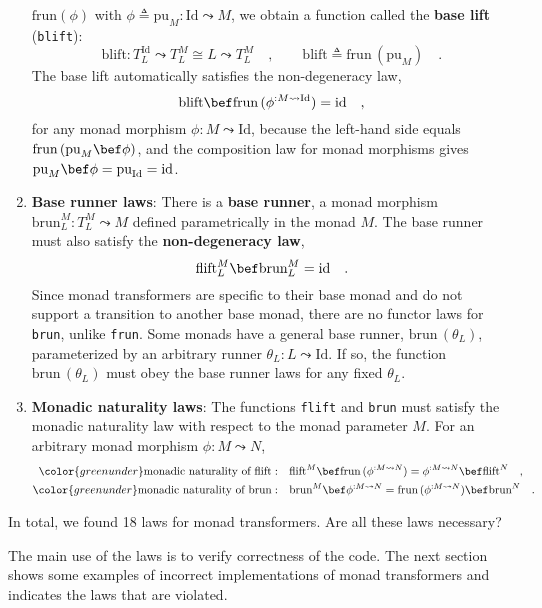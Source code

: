 \begin{enumerate}
$\text{frun}\left(\phi\right)$ with $\phi\triangleq\text{pu}_{M}:\text{Id}\leadsto M$,
we obtain a function called the \textbf{base
lift} (\lstinline!blift!):
\[
\text{blift}:T_{L}^{\text{Id}}\leadsto T_{L}^{M}\cong L\leadsto T_{L}^{M}\quad,\quad\quad\text{blift}\triangleq\text{frun}\,(\text{pu}_{M})\quad.
\]
The base lift automatically satisfies the non-degeneracy law,
\[
\text{blift}\bef\text{frun}\,(\phi^{:M\leadsto\text{Id}})=\text{id}\quad,
\]
for any monad morphism $\phi:M\leadsto\text{Id}$, because the left-hand
side equals $\text{frun}\,(\text{pu}_{M}\bef\phi)$, and the composition
law for monad morphisms gives $\text{pu}_{M}\bef\phi=\text{pu}_{\text{Id}}=\text{id}$.
\item \textbf{Base runner laws}:
There is a \textbf{base runner}, a monad morphism $\text{brun}_{L}^{M}:T_{L}^{M}\leadsto M$
defined parametrically in the monad $M$. The base runner must also
satisfy the \textbf{non-degeneracy law},
\[
\text{flift}_{L}^{M}\bef\text{brun}_{L}^{M}=\text{id}\quad.
\]
Since monad transformers are specific to their base monad and do not
support a transition to another base monad, there are no functor laws
for \lstinline!brun!, unlike \lstinline!frun!. Some monads have
a general base runner, $\text{brun}\,(\theta_{L})$, parameterized
by an arbitrary runner $\theta_{L}:L\leadsto\text{Id}$. If so, the
function $\text{brun}\,(\theta_{L})$ must obey the base runner laws
for any fixed $\theta_{L}$.
\item \textbf{Monadic naturality laws}: 
The functions \lstinline!flift! and \lstinline!brun! must satisfy
the monadic naturality law with respect to the monad parameter $M$.
For an arbitrary monad morphism $\phi:M\leadsto N$,
\begin{align*}
{\color{greenunder}\text{monadic naturality of }\text{flift}:}\quad & \text{flift}^{M}\bef\text{frun}\,(\phi^{:M\leadsto N})=\phi^{:M\leadsto N}\bef\text{flift}^{N}\quad,\\
{\color{greenunder}\text{monadic naturality of }\text{brun}:}\quad & \text{brun}^{M}\bef\phi^{:M\leadsto N}=\text{frun}\,(\phi^{:M\leadsto N})\bef\text{brun}^{N}\quad.
\end{align*}
\end{enumerate}
In total, we found 18 laws for monad transformers. Are all these laws
necessary? 

The main use of the laws is to verify correctness of the code. The
next section shows some examples of incorrect implementations of monad
transformers and indicates the laws that are violated.

